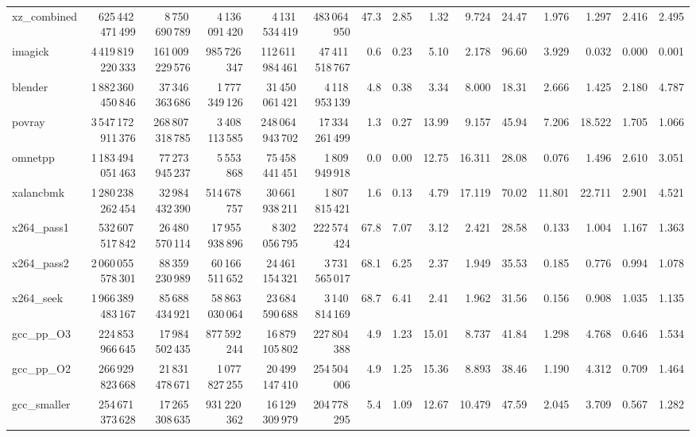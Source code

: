 \documentclass[9pt,landscape,a4paper]{article}
\begin{document}
\begin{adjustbox}{max width=\textwidth, max totalheight=0.50\textheight}
\begin{tabular}{lrrrrrrrrrrrrrr}
xz\_combined & 625\,442\,471\,499 & 8\,750\,690\,789 & 4\,136\,091\,420 & 4\,131\,534\,419 & 483\,064\,950 & 47.3 & 2.85 & 1.32 & 9.724 & 24.47 & 1.976 & 1.297 & 2.416 & 2.495 \\
imagick & 4\,419\,819\,220\,333 & 161\,009\,229\,576 & 985\,726\,347 & 112\,611\,984\,461 & 47\,411\,518\,767 & 0.6 & 0.23 & 5.10 & 2.178 & 96.60 & 3.929 & 0.032 & 0.000 & 0.001 \\
blender & 1\,882\,360\,450\,846 & 37\,346\,363\,686 & 1\,777\,349\,126 & 31\,450\,061\,421 & 4\,118\,953\,139 & 4.8 & 0.38 & 3.34 & 8.000 & 18.31 & 2.666 & 1.425 & 2.180 & 4.787 \\
povray & 3\,547\,172\,911\,376 & 268\,807\,318\,785 & 3\,408\,113\,585 & 248\,064\,943\,702 & 17\,334\,261\,499 & 1.3 & 0.27 & 13.99 & 9.157 & 45.94 & 7.206 & 18.522 & 1.705 & 1.066 \\
omnetpp & 1\,183\,494\,051\,463 & 77\,273\,945\,237 & 5\,553\,868 & 75\,458\,441\,451 & 1\,809\,949\,918 & 0.0 & 0.00 & 12.75 & 16.311 & 28.08 & 0.076 & 1.496 & 2.610 & 3.051 \\
xalancbmk & 1\,280\,238\,262\,454 & 32\,984\,432\,390 & 514\,678\,757 & 30\,661\,938\,211 & 1\,807\,815\,421 & 1.6 & 0.13 & 4.79 & 17.119 & 70.02 & 11.801 & 22.711 & 2.901 & 4.521 \\
x264\_pass1 & 532\,607\,517\,842 & 26\,480\,570\,114 & 17\,955\,938\,896 & 8\,302\,056\,795 & 222\,574\,424 & 67.8 & 7.07 & 3.12 & 2.421 & 28.58 & 0.133 & 1.004 & 1.167 & 1.363 \\
x264\_pass2 & 2\,060\,055\,578\,301 & 88\,359\,230\,989 & 60\,166\,511\,652 & 24\,461\,154\,321 & 3\,731\,565\,017 & 68.1 & 6.25 & 2.37 & 1.949 & 35.53 & 0.185 & 0.776 & 0.994 & 1.078 \\
x264\_seek & 1\,966\,389\,483\,167 & 85\,688\,434\,921 & 58\,863\,030\,064 & 23\,684\,590\,688 & 3\,140\,814\,169 & 68.7 & 6.41 & 2.41 & 1.962 & 31.56 & 0.156 & 0.908 & 1.035 & 1.135 \\
gcc\_pp\_O3 & 224\,853\,966\,645 & 17\,984\,502\,435 & 877\,592\,244 & 16\,879\,105\,802 & 227\,804\,388 & 4.9 & 1.23 & 15.01 & 8.737 & 41.84 & 1.298 & 4.768 & 0.646 & 1.534 \\
gcc\_pp\_O2 & 266\,929\,823\,668 & 21\,831\,478\,671 & 1\,077\,827\,255 & 20\,499\,147\,410 & 254\,504\,006 & 4.9 & 1.25 & 15.36 & 8.893 & 38.46 & 1.190 & 4.312 & 0.709 & 1.464 \\
gcc\_smaller & 254\,671\,373\,628 & 17\,265\,308\,635 & 931\,220\,362 & 16\,129\,309\,979 & 204\,778\,295 & 5.4 & 1.09 & 12.67 & 10.479 & 47.59 & 2.045 & 3.709 & 0.567 & 1.282 \\

\end{tabular}
\end{adjustbox}
\end{document}
